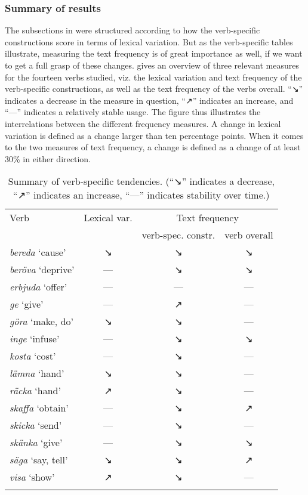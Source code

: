 \documentclass[output=paper]{langscibook}
\begin{document}
\subsubsection{Summary of results}\label{sec:valdeson:5.3.5}


The subsections in  were structured according to how the verb-specific constructions score in terms of lexical variation. But as the verb-specific tables illustrate, measuring the text frequency is of great importance as well, if we want to get a full grasp of these changes.  gives an overview of three relevant measures for the fourteen verbs studied, viz. the lexical variation and text frequency of the verb-specific constructions, as well as the text frequency of the verbs overall. ``↘'' indicates a decrease in the measure in question, ``↗'' indicates an increase, and ``---'' indicates a relatively stable usage. The figure thus illustrates the interrelations between the different frequency measures. A change in lexical variation is defined as a change larger than ten percentage points. When it comes to the two measures of text frequency, a change is defined as a change of at least 30\% in either direction.


\begin{table}
\begin{tabular}{lccc}
\lsptoprule
Verb & Lexical var. & \multicolumn{2}{c}{Text frequency}\\\cmidrule(lr){3-4} 
     & & verb-spec. constr. & verb overall\\\midrule
\textit{bereda} ‘cause’ & ↘ & ↘ & ↘\\
\textit{beröva} ‘deprive’ & --- & ↘ & ↘\\
\textit{erbjuda} ‘offer’ & --- & --- & ---\\
\textit{ge} ‘give’ & --- & ↗ & ---\\
\textit{göra} ‘make, do’ & ↘ & ↘ & ---\\
\textit{inge} ‘infuse’ & --- & ↘ & ↘\\
\textit{kosta} ‘cost’ & --- & ↘ & ---\\
\textit{lämna} ‘hand’ & ↘ & ↘ & ---\\
\textit{räcka} ‘hand’ & ↗ & ↘ & ---\\
\textit{skaffa} ‘obtain’ &  --- & ↘ & ↗\\
\textit{skicka} ‘send’ & --- & ↘ & ---\\
\textit{skänka} ‘give’ & --- & ↘ & ↘\\
\textit{säga} ‘say, tell’ & ↘ & ↘ & ↗\\
\textit{visa} ‘show’ & ↗ & ↘ & ---\\
\lspbottomrule
\end{tabular}
\caption{Summary of verb-specific tendencies. (``↘'' indicates a decrease, ``↗'' indicates an increase, ``---'' indicates stability over time.)\label{fig:valdeson:3}}
\end{table}
\end{document}
